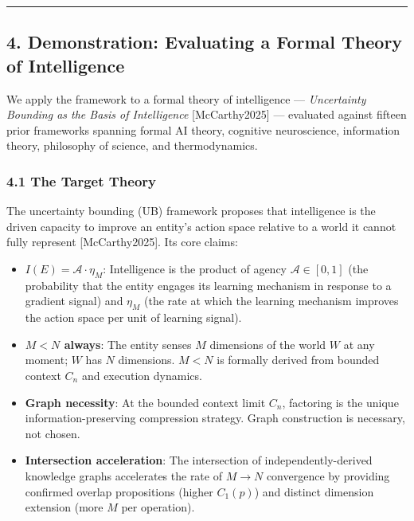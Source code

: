 \documentclass[
]{article}
\providecommand{\tightlist}{%
  \setlength{\itemsep}{0pt}\setlength{\parskip}{0pt}}
\begin{document}
\begin{center}\rule{0.5\linewidth}{0.5pt}\end{center}

\subsection{4. Demonstration: Evaluating a Formal Theory of
Intelligence}\label{demonstration-evaluating-a-formal-theory-of-intelligence}

We apply the framework to a formal theory of intelligence ---
\emph{Uncertainty Bounding as the Basis of Intelligence}
{[}McCarthy2025{]} --- evaluated against fifteen prior frameworks
spanning formal AI theory, cognitive neuroscience, information theory,
philosophy of science, and thermodynamics.

\subsubsection{4.1 The Target Theory}\label{the-target-theory}

The uncertainty bounding (UB) framework proposes that intelligence is
the driven capacity to improve an entity's action space relative to a
world it cannot fully represent {[}McCarthy2025{]}. Its core claims:

\begin{itemize}
\tightlist
\item
  \textbf{\(I(E) = \mathcal{A} \cdot \eta_M\)}: Intelligence is the
  product of agency \(\mathcal{A} \in [0,1]\) (the probability that the
  entity engages its learning mechanism in response to a gradient
  signal) and \(\eta_M\) (the rate at which the learning mechanism
  improves the action space per unit of learning signal).
\item
  \textbf{\(M < N\) always}: The entity senses \(M\) dimensions of the
  world \(W\) at any moment; \(W\) has \(N\) dimensions. \(M < N\) is
  formally derived from bounded context \(C_n\) and execution dynamics.
\item
  \textbf{Graph necessity}: At the bounded context limit \(C_n\),
  factoring is the unique information-preserving compression strategy.
  Graph construction is necessary, not chosen.
\item
  \textbf{Intersection acceleration}: The intersection of
  independently-derived knowledge graphs accelerates the rate of
  \(M \to N\) convergence by providing confirmed overlap propositions
  (higher \(C_1(p)\)) and distinct dimension extension (more \(M\) per
  operation).
\end{itemize}
\end{document}
